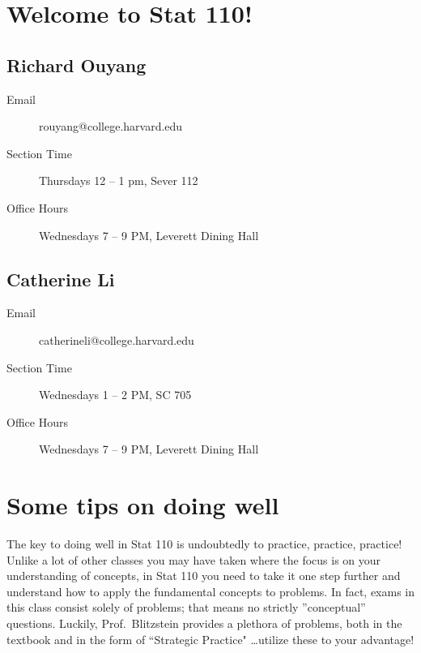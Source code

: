 \documentclass{article}
\begin{document}
\header

\section{Welcome to Stat 110!}

\subsection{Richard Ouyang}

\begin{description}

\item[Email] rouyang@college.harvard.edu

\item[Section Time] Thursdays 12 -- 1 pm, Sever 112

\item[Office Hours] Wednesdays 7 -- 9 PM, Leverett Dining Hall

\end{description}

\subsection{Catherine Li}

\begin{description}

\item[Email] catherineli@college.harvard.edu

\item[Section Time] Wednesdays 1 -- 2 PM, SC 705

\item[Office Hours] Wednesdays 7 -- 9 PM, Leverett Dining Hall

\end{description}

\section{Some tips on doing well}

The key to doing well in Stat 110 is undoubtedly to practice, practice, practice! Unlike a lot of other classes you may have taken where the focus is on your understanding of concepts, in Stat 110 you need to take it one step further and understand how to apply the fundamental concepts to problems. In fact, exams in
this class consist solely of problems; that means no strictly ”conceptual” questions. Luckily, Prof.~Blitzstein provides a plethora of problems, both in the textbook and in the form of ``Strategic Practice" \dots utilize these to your advantage!
\end{document}

